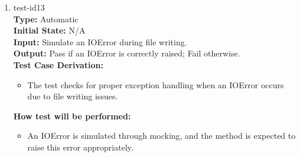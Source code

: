 \documentclass[12pt, titlepage]{article}
\begin{document}
\begin{enumerate}
\item{test-id13\\}
\textbf{Type:} Automatic\\
\textbf{Initial State:} N/A\\
\textbf{Input:} Simulate an IOError during file writing.\\
\textbf{Output:} Pass if an IOError is correctly raised; Fail otherwise.\\
\textbf{Test Case Derivation:}
\begin{itemize}
    \item The test checks for proper exception handling when an IOError 
    occurs due to file writing issues.
\end{itemize}
\textbf{How test will be performed:}
\begin{itemize}
    \item An IOError is simulated through mocking, and the method is 
    expected to raise this error appropriately.
\end{itemize}


\end{enumerate}
\end{document}
